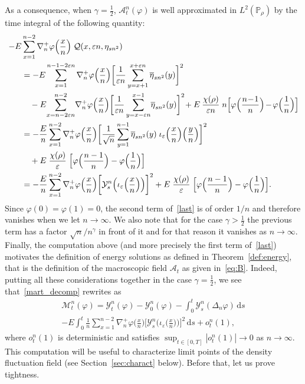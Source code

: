 \documentclass[10pt]{amsart}
\theoremstyle{definition}\newtheorem{defi}[theo]{Definition}\newtheorem{rema}[theo]{Remark}\newtheorem{exam}[theo]{Example}\newtheorem{exem}[theo]{Example}\newtheorem{nota}[theo]{Notation}
\newcommand{\bb}[1]{{\mathbb #1}}
\newcommand{\mc}[1]{{\mathcal #1}}
\renewcommand{\mc}[1]{{\mathcal #1}}
\newcommand{\pfrac}[2]{\genfrac{}{}{}{1}{#1}{#2}}
\renewcommand{\bar}{\overline}
\newcommand*{\dd}{\mathrm{d}}
\newcommand*{\ds}{\dd s}
\newcommand*{\Mk}{\mkern -2mu}
\renewcommand{\pfrac}{\frac}
\begin{document}
As a consequence, when $\gamma=\frac12$, $\mc A_t^n(\varphi)$ is well approximated in $ L^2(\bb P_\rho)$ by the time integral of the following quantity:
\begin{align}
-E&\sum_{x=1}^{n-2} \nabla_n^+ \varphi\Big(\pfrac{x}{n}\Big)\; \mc Q(x,\varepsilon n,\eta_{sn^2})\notag\\
& = -E\sum_{x=1}^{n-1-2\varepsilon n}\nabla_n^+\varphi\Big(\pfrac{x}{n}\Big) \bigg[\frac{1}{\varepsilon n} \sum_{y=x+1}^{x+\varepsilon n} \bar\eta_{sn^2}(y)\bigg]^2 \notag \\
& \quad -E \!\sum_{x=n-2\varepsilon n}^{n-2}\!\nabla_n^+\varphi\Big(\pfrac{x}{n}\Big) \bigg[\frac{1}{\varepsilon n} \sum_{y=x-\varepsilon n}^{x-1} \!\bar\eta_{sn^2}(y)\bigg]^2 \!+E\:\frac{\chi(\rho)}{\varepsilon n} \; n \Big[\varphi\Big(\pfrac{n\!-\!1}{n}\Big)\Mk-\Mk\varphi\Big(\pfrac{1}{n}\Big)\Big] \notag\!\\
& =- \frac{E}{n}\sum_{x=1}^{n-2} \nabla_n^+ \varphi\Big(\pfrac{x}{n}\Big)\bigg[\frac{1}{\sqrt n} \sum_{y=1}^{n-1} \bar\eta_{sn^2}(y)\; \iota_\varepsilon\Big(\pfrac{x}{n}\Big)\Big(\pfrac{y}{n}\Big)\bigg]^2 \notag \\
& \quad +E \;\frac{\chi(\rho)}{\varepsilon } \; \Big[\varphi\Big(\pfrac{n-1}{n}\Big)-\varphi\Big(\pfrac{1}{n}\Big)\Big]\notag \\
& = -\frac{E}{n}\sum_{x=1}^{n-2} \nabla_n^+\varphi\Big(\pfrac{x}{n}\Big) \bigg[\mc Y^n_s\Big(\iota_\varepsilon\Big(\pfrac{x}{n}\Big)\Big)\bigg]^2 +E \;\frac{\chi(\rho)}{\varepsilon } \; \Big[\varphi\Big(\pfrac{n-1}{n}\Big)-\varphi\Big(\pfrac{1}{n}\Big)\Big]. \label{last}
\end{align}
Since $\varphi(0)=\varphi(1)=0$, the second term of~\eqref{last} is of order $1/n$ and therefore vanishes when we let $n\to \infty$. We also note that for the case $\gamma>\frac12$ the previous term has a factor $\sqrt n/n^\gamma$ in front of it and for that reason it vanishes as $n\to\infty$. Finally, the computation above (and more precisely the first term of~\eqref{last}) motivates the definition of energy solutions as defined in Theorem~\ref{def:energy}, that is the definition of the macroscopic field $\mc A_t$ as given in~\eqref{eq:B}. Indeed, putting all these considerations together in the case $\gamma=\frac12$, we see that~\eqref{mart_decomp} rewrites as
\begin{multline}
\mc M_t^n(\varphi)=\mc Y_t^n(\varphi) - \mc Y_0^n(\varphi) - \int_0^t \mc Y_s^n(\Delta_n\varphi) \,\ds \\
- E \int_0^t \frac{1}{n}\sum_{x=1}^{n-2} \nabla_n^+\varphi\big(\pfrac{x}{n}\big) \bigg[\mc Y_s^n\Big(\iota_\varepsilon\big(\pfrac{x}{n}\big)\Big)\bigg]^2 \,\ds + o^n_t(1), \label{eq:mart_2}
\end{multline}
where $o^n_t(1)$ is deterministic and satisfies $\sup_{t \in [0,T]} |o^n_t(1)| \to 0$ as $n \to \infty$. This computation will be useful to characterize limit points of the density fluctuation field (see Section~\ref{sec:charact} below). Before that, let us prove tightness.
\end{document}
